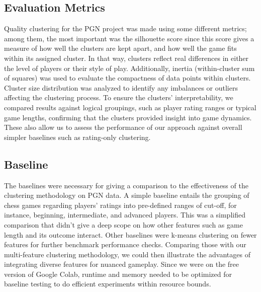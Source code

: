 \documentclass[conference]{IEEEtran}
\begin{document}
\subsection{Evaluation Metrics}
Quality clustering for the PGN project was made using some different metrics; among them, the most important was the silhouette score since this score gives a measure of how well the clusters are kept apart, and how well the game fits within its assigned cluster. In that way, clusters reflect real differences in either the level of players or their style of play. Additionally, inertia (within-cluster sum of squares) was used to evaluate the compactness of data points within clusters. Cluster size distribution was analyzed to identify any imbalances or outliers affecting the clustering process. To ensure the clusters' interpretability, we compared results against logical groupings, such as player rating ranges or typical game lengths, confirming that the clusters provided insight into game dynamics. These also allow us to assess the performance of our approach against overall simpler baselines such as rating-only clustering.

\subsection{Baseline}
The baselines were necessary for giving a comparison to the effectiveness of the clustering methodology on PGN data. A simple baseline entails the grouping of chess games regarding players' ratings into pre-defined ranges of cut-off, for instance, beginning, intermediate, and advanced players. This was a simplified comparison that didn't give a deep scope on how other features such as game length and its outcome interact. Other baselines were k-means clustering on fewer features for further benchmark performance checks. Comparing those with our multi-feature clustering methodology, we could then illustrate the advantages of integrating diverse features for nuanced gameplay. Since we were on the free version of Google Colab, runtime and memory needed to be optimized for baseline testing to do efficient experiments within resource bounds.
\end{document}
